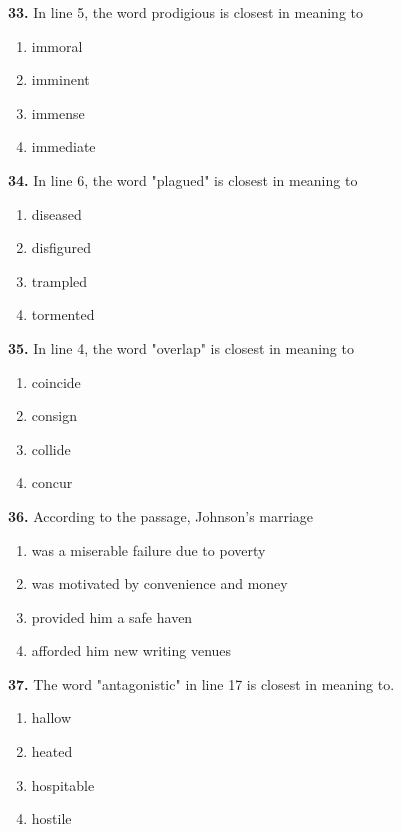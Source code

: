 \documentclass[12pt]{article}
\begin{document}
\noindent\textbf{33.} In line 5, the word prodigious is closest in meaning to
\begin{enumerate}[label=(\Alph*),leftmargin=*,itemsep=0.2em]
\item immoral
\item imminent
\item immense
\item immediate
\end{enumerate}
\par
\vspace{0.25\baselineskip}
\noindent\textbf{34.} In line 6, the word "plagued" is closest in meaning to
\begin{enumerate}[label=(\Alph*),leftmargin=*,itemsep=0.2em]
\item diseased
\item disfigured
\item trampled
\item tormented
\end{enumerate}
\par
\vspace{0.25\baselineskip}
\noindent\textbf{35.} In line 4, the word "overlap" is closest in meaning to
\begin{enumerate}[label=(\Alph*),leftmargin=*,itemsep=0.2em]
\item coincide
\item consign
\item collide
\item concur
\end{enumerate}
\par
\vspace{0.25\baselineskip}
\noindent\textbf{36.} According to the passage, Johnson's marriage
\begin{enumerate}[label=(\Alph*),leftmargin=*,itemsep=0.2em]
\item was a miserable failure due to poverty
\item was motivated by convenience and money
\item provided him a safe haven
\item afforded him new writing venues
\end{enumerate}
\par
\vspace{0.25\baselineskip}
\noindent\textbf{37.} The word "antagonistic" in line 17 is closest in meaning to.
\begin{enumerate}[label=(\Alph*),leftmargin=*,itemsep=0.2em]
\item hallow
\item heated
\item hospitable
\item hostile
\end{enumerate}
\end{document}
